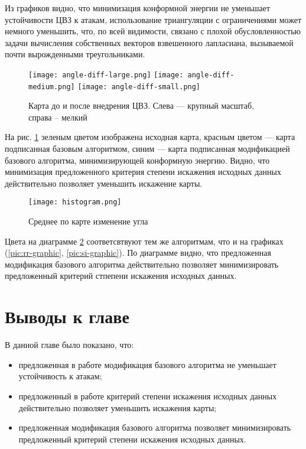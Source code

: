 Из графиков видно, что минимизация конформной энергии не уменьшает устойчивости ЦВЗ к атакам, использование триангуляции с ограничениями может немного
уменьшить, что, по всей видимости, связано с плохой обусловленностью задачи вычисления собственных векторов взвешенного лапласиана, 
вызываемой почти вырожденными треугольниками.

\begin{figure}[h]
    \centerline {
        \mbox{\texttt{[image: angle-diff-large.png]}}
        \mbox{\texttt{[image: angle-diff-medium.png]}}
        \mbox{\texttt{[image: angle-diff-small.png]}}
    }
    \caption{Карта до и после внедрения ЦВЗ. Слева --- крупный масштаб, справа -- мелкий}
    \label{pic:angle-diff}
\end{figure}

На рис. \ref{pic:angle-diff} зеленым цветом изображена исходная карта, красным цветом --- карта подписанная базовым алгоритмом, 
синим --- карта подписанная модификацией базового алгоритма, минимизирующей конформную энергию. Видно, 
что минимизация предложенного критерия степени искажения исходных данных действительно позволяет уменьшить искажение карты. 

\begin{figure}
    \centerline {
        \texttt{[image: histogram.png]}
    }
    \caption{Среднее по карте изменение угла}
    \label{pic:histogram}
\end{figure}

Цвета на диаграмме \ref{pic:histogram} соответсвтвуют тем же алгоритмам, что и на графиках (\ref{pic:rr-graphic}, \ref{pic:si-graphic}). 
По диаграмме видно, что предложенная модификация базового алгоритма действительно позволяет минимизировать предложенный критерий стпепени искажения 
исходных данных.

\section{Выводы к главе}
В данной главе было показано, что:
\begin{itemize}
    \item предложенная в работе модификация базового алгоритма не уменьшает устойчивость к атакам;
    \item предложенный в работе критерий степени искажения исходных данных действительно позволяет уменьшить искажения карты;
    \item предложенная модификация базового алгоритма позволяет минимизировать предложенный критерий степени искажения исходных данных.
\end{itemize}
